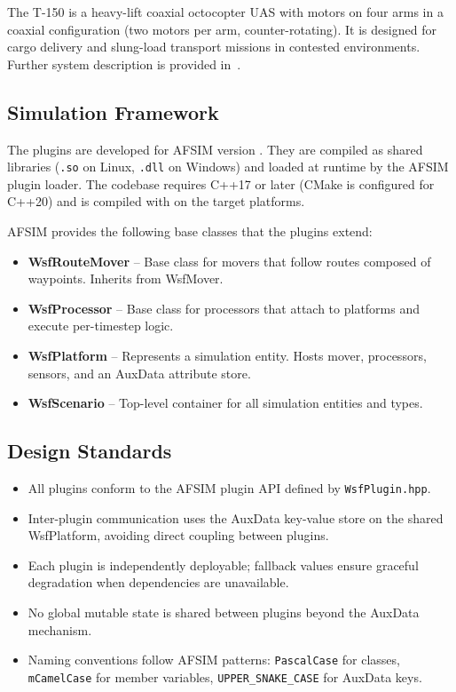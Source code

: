 \unclass The T-150 is a heavy-lift coaxial octocopter UAS with \motorCount{} motors on four arms in a coaxial configuration (two motors per arm, counter-rotating). It is designed for cargo delivery and slung-load transport missions in contested environments. Further system description is provided in~\cite{T150UAM}.

\subsection{\unclass Simulation Framework}\label{sec:SimulationFramework}

\unclass The plugins are developed for AFSIM version \afsimVersion{}. They are compiled as shared libraries (\texttt{.so} on Linux, \texttt{.dll} on Windows) and loaded at runtime by the AFSIM plugin loader. The codebase requires C++17 or later (CMake is configured for C++20) and is compiled with \compilerVersion{} on the target platforms.

\unclass AFSIM provides the following base classes that the plugins extend:

\begin{itemize}
	\item \unclass \textbf{WsfRouteMover} -- Base class for movers that follow routes composed of waypoints. Inherits from WsfMover.
	\item \unclass \textbf{WsfProcessor} -- Base class for processors that attach to platforms and execute per-timestep logic.
	\item \unclass \textbf{WsfPlatform} -- Represents a simulation entity. Hosts mover, processors, sensors, and an AuxData attribute store.
	\item \unclass \textbf{WsfScenario} -- Top-level container for all simulation entities and types.
\end{itemize}

\subsection{\unclass Design Standards}\label{sec:DesignStandards}

\begin{itemize}
	\item \unclass All plugins conform to the AFSIM plugin API defined by \texttt{WsfPlugin.hpp}.
	\item \unclass Inter-plugin communication uses the AuxData key-value store on the shared WsfPlatform, avoiding direct coupling between plugins.
	\item \unclass Each plugin is independently deployable; fallback values ensure graceful degradation when dependencies are unavailable.
	\item \unclass No global mutable state is shared between plugins beyond the AuxData mechanism.
	\item \unclass Naming conventions follow AFSIM patterns: \texttt{PascalCase} for classes, \texttt{mCamelCase} for member variables, \texttt{UPPER\_SNAKE\_CASE} for AuxData keys.
\end{itemize}


